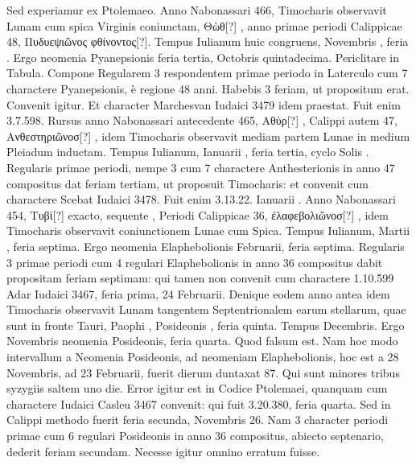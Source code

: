Sed experiamur ex Ptolemaeo.
Anno Nabonassari 466, Timocharis observavit Lunam cum
spica Virginis coniunctam, \textgreek{Θὼθ[?] },
anno primae periodi Calippicae 48,
\textgreek{Πυδυεψιῶνος  φθίνοντος[?]}.
Tempus Iulianum huic congruens, Novembris
, feria .
Ergo neomenia Pyanepsionis feria tertia, Octobris
quintadecima.
Periclitare in Tabula.
Compone Regularem 3
respondentem primae periodo in Laterculo cum 7 charactere Pyanepsionis,
è regione 48 anni.
Habebis 3 feriam, ut propositum erat.
Convenit
igitur.
Et character Marchesvan Iudaici 3479 idem praestat.
Fuit enim 3.7.598.
Rursus anno Nabonassari antecedente 465, \textgreek{Αθὺρ[?]
}, Calippi autem 47, \textgreek{Ανθεστηριῶνοσ[?] },
 idem Timocharis observavit
mediam partem Lunae in medium Pleiadum inductam.
Tempus Iulianum,
Ianuarii , feria tertia, cyclo Solis .
Regularis primae
periodi, nempe 3 cum 7 charactere Anthesterionis in anno 47 compositus
dat feriam tertiam, ut proposuit Timocharis: et convenit cum
charactere Scebat Iudaici 3478.
Fuit enim 3.13.22. Ianuarii .
Anno Nabonassari 454, \textgreek{Τυβὶ[?] }
 exacto, sequente \textgreek{}, Periodi Calippicae
36, \textgreek{ἐλαφεβολιῶνοσ[?] }, idem
 Timocharis observavit coniunctionem
Lunae cum Spica.
Tempus Iulianum, Martii , feria septima.
Ergo neomenia Elaphebolionis  Februarii, feria septima.
Regularis
3 primae periodi cum 4 regulari Elaphebolionis in anno 36 compositus
dabit propositam feriam septimam: qui tamen non convenit
cum charactere 1.10.599 Adar Iudaici 3467, feria prima, 24 Februarii.
Denique eodem anno antea idem Timocharis observavit
Lunam tangentem Septentrionalem earum stellarum, quae sunt in
fronte Tauri, Paophi , Posideonis , feria quinta.
Tempus 
Decembris.
Ergo  Novembris neomenia Posideonis, feria
quarta.
Quod falsum est.
Nam hoc modo intervallum a Neomenia
Posideonis, ad neomeniam Elaphebolionis, hoc est a 28 Novembris,
ad 23 Februarii, fuerit dierum duntaxat 87.
Qui sunt minores tribus syzygiis
saltem uno die.
Error igitur est in Codice Ptolemaei, quanquam
cum charactere Iudaici Casleu 3467 convenit: qui fuit 3.20.380,
feria quarta.
Sed in Calippi methodo fuerit feria secunda, Novembris
26.
Nam 3 character periodi primae cum 6 regulari Posideonis
in anno 36 compositus, abiecto septenario, dederit feriam secundam.
Necesse igitur omnino erratum fuisse.

